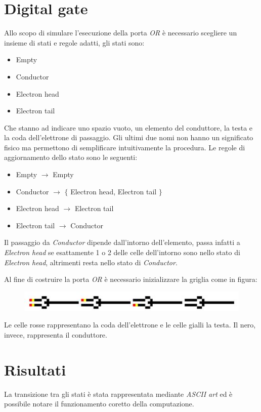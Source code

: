 \documentclass[12pt]{article}
\begin{document}
\section{Digital gate}
Allo scopo di simulare l'esecuzione della porta \emph{OR} è necessario scegliere un insieme di stati e regole adatti, gli stati sono:
\begin{itemize}
\item Empty
\item Conductor
\item Electron head
\item Electron tail
\end{itemize}
Che stanno ad indicare uno spazio vuoto, un elemento del conduttore, la testa e la coda dell'elettrone di passaggio. Gli ultimi due nomi non hanno un significato fisico ma permettono di semplificare intuitivamente la procedura.
Le regole di aggiornamento dello stato sono le seguenti:
\begin{itemize}
\item Empty $\rightarrow$ Empty
\item Conductor $\rightarrow$  $\lbrace$ Electron head,  Electron tail $\rbrace$
\item Electron head $\rightarrow$ Electron tail
\item Electron tail $\rightarrow$ Conductor
\end{itemize}
Il passaggio da \emph{Conductor} dipende dall'intorno dell'elemento, passa infatti a \emph{Electron head} se esattamente 1 o 2 delle celle dell'intorno sono nello stato di \emph{Electron head}, altrimenti resta nello stato di \emph{Conductor}.

Al fine di costruire la porta \emph{OR} è necessario inizializzare la griglia come in figura: 
\begin{figure}[h]
\includegraphics{Digital_gate.jpg}
\centering
\end{figure}
Le celle rosse rappresentano la coda dell'elettrone e le celle gialli la testa. Il nero, invece, rappresenta il conduttore.

\section{Risultati}
La transizione tra gli stati è stata rappresentata mediante \emph{ASCII art} ed è possibile notare il funzionamento coretto della computazione.
\end{document}
